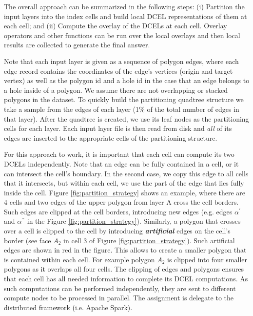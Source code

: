 The overall approach can be summarized in the following steps: (i) Partition the input layers into the index cells and build local DCEL representations of them at each cell; and (ii) Compute the overlay of the DCELs at each cell.  
Overlay operators and other functions can be run over the local overlays and then local results are collected to generate the final answer.  

Note that each input layer is given as a sequence of polygon edges, where each edge record contains the coordinates of the edge's vertices (origin and target vertex) as well as the polygon id and a hole id in the case that an edge belongs to a hole inside of a polygon. We assume there are not overlapping or stacked polygons in the dataset.  To quickly build the partitioning quadtree structure we take a sample from the edges of each layer (1\% of the total number of edges in that layer). After the quadtree is created, we use its leaf nodes as the partitioning cells for each layer. 
Each input layer file is then read from disk and \textit{all} of its edges are inserted to the appropriate cells of the partitioning structure.

For this approach to work, it is important that each cell can compute its two DCELs independently. 
Note that an edge can be fully contained in a cell, or it can intersect the cell's boundary.
In the second case, we copy this edge to all cells that it intersects, but within each cell, we use the part of the edge that lies fully inside the cell. 
Figure \ref{fig:partition_strategy} shows an example, where there are 4 cells and two edges of the upper polygon from layer A cross the cell borders. Such edges are clipped at the cell borders, introducing new edges (e.g. edges $\alpha^{\prime}$ and $\alpha^{\prime \prime}$ in the Figure \ref{fig:partition_strategy}).  
Similarly, a polygon that crosses over a cell is clipped to the cell by introducing \textit{\textbf{artificial}} edges on the cell's border (see face $A_2$ in cell 3 of Figure \ref{fig:partition_strategy}). 
Such artificial edges are shown in red in the figure. 
This allows to create a smaller polygon that is contained within each cell. For example polygon $A_2$ is clipped into four smaller polygons as it overlaps all four cells. 
The clipping of edges and polygons ensures that each cell has all needed information to complete its DCEL computations. 
As such computations can be performed independently, they are sent to different compute nodes to be processed in parallel.  The assignment is delegate to the distributed framework (i.e. Apache Spark).  

